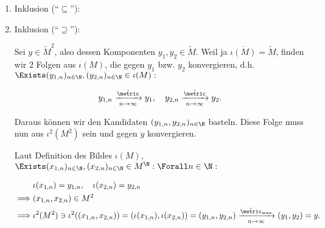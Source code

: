 \begin{solution}
\begin{enumerate}[label = \arabic*.]
\begin{enumerate}[label = 2.\arabic*.]
        \begin{enumerate}[label = \arabic*.]

            \item Inklusion (\enquote{$\subseteq$}):

            \item Inklusion (\enquote{$\supseteq$}):
            
            Sei $y \in \tilde M^2$, also dessen Komponenten $y_1, y_2 \in \tilde M$.
            Weil ja $\overline{\iota(M)} = \tilde M$, finden wir $2$ Folgen aus $\iota(M)$, die gegen $y_1$ bzw. $y_2$ konvergieren, d.h. $\Exists (y_{1, n})_{n \in \N}, (y_{2, n})_{n \in \N} \in \iota(M):$

            \begin{align*}
                y_{1, n} \xrightarrow[n \to \infty]{\tilde \metric} y_1,
                \quad
                y_{2, n} \xrightarrow[n \to \infty]{\tilde \metric} y_2.
            \end{align*}

            Daraus können wir den Kandidaten $(y_{1, n}, y_{2, n})_{n \in \N}$ basteln.
            Diese Folge muss nun aus $\iota^2(M^2)$ sein und gegen $y$ konvergieren.
            
            Laut Definition des Bildes $\iota(M)$, $\Exists (x_{1, n})_{n \in \N}, (x_{2, n})_{n \in \N} \in M^\N: \Forall n \in \N:$

            \begin{align*}
                & \iota(x_{1, n}) = y_{1, n},
                \quad
                \iota(x_{2, n}) = y_{2, n} \\
                \implies
                & (x_{1, n}, x_{2, n}) \in M^2 \\
                \implies
                & \iota^2(M^2)
                \ni
                \iota^2((x_{1, n}, x_{2, n}))
                =
                (
                    \iota(x_{1, n}),
                    \iota(x_{2, n})
                )
                =
                (y_{1, n}, y_{2, n})
                \xrightarrow[n \to \infty]{\tilde \metric_{\max}}
                (y_1, y_2)
                =
                y.
            \end{align*}

        \end{enumerate}

    \end{enumerate}

\end{enumerate}

\end{solution}

